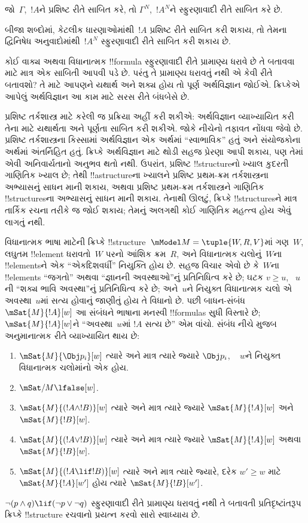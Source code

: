 \documentclass[../../../include/open-logic-section]{subfiles}
\begin{document}
\begin{thm}
જો~$\Gamma$,~$!A$ને પ્રશિષ્ટ રીતે સાબિત કરે, તો $\Gamma^N$,~$!A^N$ને
સ્ફુરણાવાદી રીતે સાબિત કરે છે.
\end{thm}

બીજા શબ્દોમાં, કેટલીક ધારણાઓમાંથી~$!A$ પ્રશિષ્ટ રીતે સાબિત કરી શકાય,
તો તેમના દ્વિનિષેધ અનુવાદોમાંથી~$!A^N$ સ્ફુરણાવાદી રીતે સાબિત કરી શકાય
છે.

કોઈ વાક્ય અથવા વિધાનાત્મક !!{formula} સ્ફુરણાવાદી રીતે પ્રામાણ્ય ધરાવે
છે તે બતાવવા માટે માત્ર એક સાબિતી આપવી પડે છે. પરંતુ તે પ્રામાણ્ય
ધરાવતું નથી એ કેવી રીતે બતાવશો? તે માટે આપણને યથાર્થ અને શક્ય હોય તો
પૂર્ણ અર્થવિજ્ઞાન જોઈએ. ક્રિપ્કેએ આપેલું અર્થવિજ્ઞાન આ કામ માટે સરસ
રીતે બંધબેસે છે.

પ્રશિષ્ટ તર્કશાસ્ત્ર માટે કરેલી જ પ્રક્રિયા અહીં કરી શકીએ: અર્થવિજ્ઞાન
વ્યાખ્યાયિત કરી તેના માટે યથાર્થતા અને પૂર્ણતા સાબિત કરી શકીએ. જોકે
નીચેનો તફાવત નોંધવા જેવો છે. પ્રશિષ્ટ તર્કશાસ્ત્રના કિસ્સામાં
અર્થવિજ્ઞાન એક અર્થમાં ``સ્વાભાવિક'' હતું અને સંયોજકોના અર્થમાં
અંતર્નિહિત હતું. ક્રિપ્કે અર્થવિજ્ઞાન માટે થોડી સહજ પ્રેરણા આપી શકાય,
પણ તેમાં એવી અનિવાર્યતાનો અનુભવ થતો નથી. ઉપરાંત, પ્રશિષ્ટ
!!{structure}નો ખ્યાલ કુદરતી ગાણિતિક ખ્યાલ છે; તેથી !!a{structure}ના
ખ્યાલને પ્રશિષ્ટ પ્રથમ-ક્રમ તર્કશાસ્ત્રના અભ્યાસનું સાધન માની શકાય,
અથવા પ્રશિષ્ટ પ્રથમ-ક્રમ તર્કશાસ્ત્રને ગાણિતિક !!{structure}sના
અભ્યાસનું સાધન માની શકાય. તેનાથી ઊલટું, ક્રિપ્કે !!{structure}sને માત્ર
તાર્કિક રચના તરીકે જ જોઈ શકાય; તેમનું અલગથી કોઈ ગાણિતિક મહત્ત્વ હોય
એવું લાગતું નથી.

વિધાનાત્મક ભાષા માટેની ક્રિપ્કે !!{structure}~$\mModel M = \tuple{W,
R, V}$માં ગણ~$W$, લઘુતમ !!{element} ધરાવતો~$W$ પરનો આંશિક ક્રમ~$R$,
અને વિધાનાત્મક ચલોનું~$W$ના !!{element}sને એક ``એકદિશવર્ધી'' નિયુક્તિ
હોય છે. સહજ વિચાર એવો છે કે~$W$ના !!{element}s ``જગતો'' અથવા
``જ્ઞાનની અવસ્થાઓ''નું પ્રતિનિધિત્વ કરે છે; ઘટક $v \geq u$,
~$u$ની ``શક્ય ભાવિ અવસ્થા''નું પ્રતિનિધિત્વ કરે છે; અને~$u$ને નિયુક્ત
વિધાનાત્મક ચલો એ અવસ્થા~$u$માં સત્ય હોવાનું જાણીતું હોય તે વિધાનો છે.
પછી બાધન-સંબંધ $\mSat{M}{!A}[w]$ આ સંબંધને ભાષાના મનસ્વી
!!{formula}s સુધી વિસ્તારે છે; $\mSat{M}{!A}[w]$ને ``અવસ્થા~$w$માં
$!A$ સત્ય છે'' એમ વાંચો. સંબંધ નીચે મુજબ અનુમાનાત્મક રીતે વ્યાખ્યાયિત
થાય છે:
\begin{enumerate}
\item $\mSat{M}{\Obj p_i}[w]$ ત્યારે અને માત્ર ત્યારે જ્યારે $\Obj p_i$,
  ~ $w$ને નિયુક્ત વિધાનાત્મક ચલોમાંનો એક હોય.
\item $\mSat/{M}{\lfalse}[w]$.
\item $\mSat{M}{(!A \land !B)}[w]$ ત્યારે અને માત્ર ત્યારે જ્યારે
  $\mSat{M}{!A}[w]$ અને $\mSat{M}{!B}[w]$.
\item $\mSat{M}{(!A \lor !B)}[w]$ ત્યારે અને માત્ર ત્યારે જ્યારે
  $\mSat{M}{!A}[w]$ અથવા $\mSat{M}{!B}[w]$.
\item $\mSat{M}{(!A \lif !B)}[w]$ ત્યારે અને માત્ર ત્યારે જ્યારે, દરેક
  $w' \geq w$ માટે $\mSat{M}{!A}[w']$ હોય ત્યારે $\mSat{M}{!B}[w']$.
\end{enumerate}
$\lnot (p \land q) \lif (\lnot p \lor \lnot q)$ સ્ફુરણાવાદી રીતે
પ્રામાણ્ય ધરાવતું નથી તે બતાવતી પ્રતિદૃષ્ટાંતરૂપ ક્રિપ્કે !!{structure}
રચવાનો પ્રયત્ન કરવો સારો સ્વાધ્યાય છે.
\end{document}
